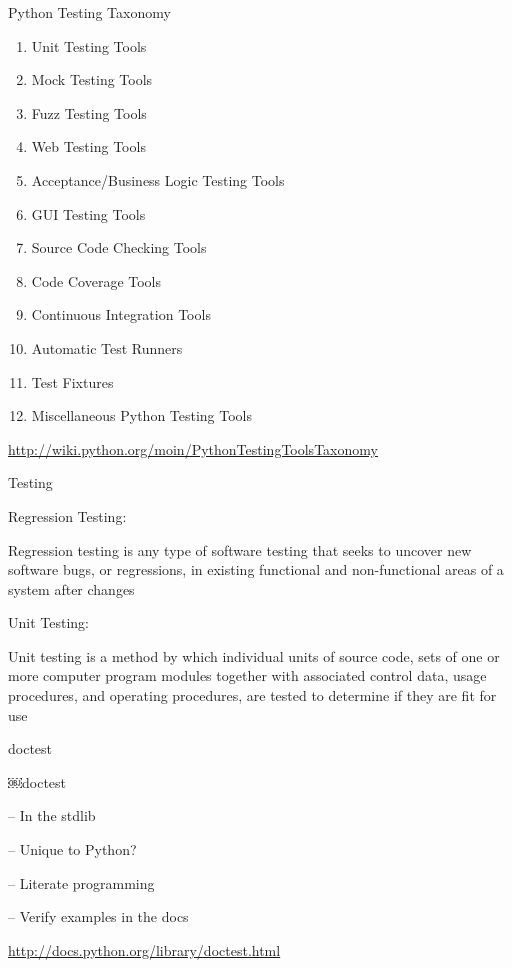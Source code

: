 \documentclass{beamer}
\begin{document}
\begin{frame}[fragile]{Python Testing Taxonomy}

\begin{enumerate}
  \item    Unit Testing Tools
  \item    Mock Testing Tools
  \item    Fuzz Testing Tools
  \item    Web Testing Tools
  \item    Acceptance/Business Logic Testing Tools
  \item    GUI Testing Tools
  \item    Source Code Checking Tools
  \item    Code Coverage Tools
  \item    Continuous Integration Tools
  \item    Automatic Test Runners
  \item    Test Fixtures
  \item    Miscellaneous Python Testing Tools
\end{enumerate}

\vfill
\url{http://wiki.python.org/moin/PythonTestingToolsTaxonomy}

\end{frame} 


\begin{frame}[fragile]{Testing}

\vfill
{\LARGE Regression Testing:}

\vfill
{\Large Regression testing is any type of software testing that seeks to
uncover new software bugs, or regressions, in existing functional and
non-functional areas of a system after changes}

\vfill
{\LARGE Unit Testing:}

\vfill
{\Large Unit testing is a method by which individual units of source code,
sets of one or more computer program modules together with associated control
data, usage procedures, and operating procedures, are tested to determine if
they are fit for use}

\vfill

\end{frame} 


\begin{frame}[fragile]{doctest}

{\LARGE￼doctest}

\vfill
{\Large \vspace{0.3in} -- In the stdlib}

\vfill
{\Large \vspace{0.3in} -- Unique to Python?}

\vfill
{\Large \vspace{0.3in} -- Literate programming}

\vfill
{\Large \vspace{0.3in} -- Verify examples in the docs}

\vfill
\url{http://docs.python.org/library/doctest.html}


\end{frame} 
\end{document}

